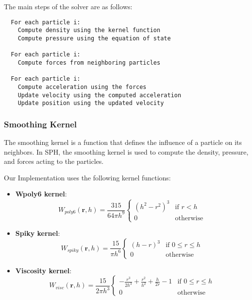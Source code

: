 \documentclass[a4paper]{article}
\begin{document}
The main steps of the solver are as follows:
\begin{verbatim}
  For each particle i:
    Compute density using the kernel function
    Compute pressure using the equation of state
  
  For each particle i:
    Compute forces from neighboring particles
  
  For each particle i:
    Compute acceleration using the forces
    Update velocity using the computed acceleration
    Update position using the updated velocity
\end{verbatim}

\subsubsection{Smoothing Kernel}

The smoothing kernel is a function that defines the influence of a particle on its neighbors.
In SPH, the smoothing kernel is used to compute the density, pressure, and forces acting to the particles.

Our Implementation uses the following kernel functions:
\begin{itemize}
  \item \textbf{Wpoly6 kernel}:
    \begin{equation}
      \nonumber
      W_{poly6}(\mathbf{r}, h) = \frac{315}{64 \pi h^9} \begin{cases}
        (h^2 - r^2)^3 & \text{if } r < h \\
        0 & \text{otherwise}
      \end{cases}
    \end{equation}
  \item \textbf{Spiky kernel}:
    \begin{equation}
    \nonumber
      W_{spiky}(\mathbf{r}, h) = \frac{15}{\pi h^6} \begin{cases}
        (h - r)^3 & \text{if } 0 \le r \le h \\
        0 & \text{otherwise}
      \end{cases}
    \end{equation}
  \item \textbf{Viscosity kernel}:
    \begin{equation}
    \nonumber
      W_{visc}(\mathbf{r}, h) = \frac{15}{2 \pi h^3} \begin{cases}
        -\frac{r^3}{2h^3} + \frac{r^2}{h^2} + \frac{h}{2r} - 1 & \text{if } 0 \le r \le h \\
        0 & \text{otherwise}
      \end{cases}
    \end{equation}
\end{itemize}
\end{document}
